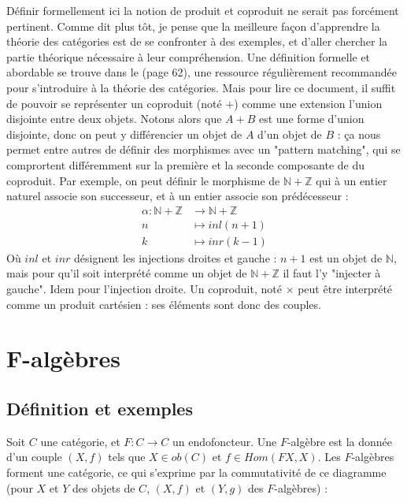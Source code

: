 \documentclass{article}
\newcommand{\N}{\mathbb{N}}
\newcommand{\Z}{\mathbb{Z}}
\begin{document}
Définir formellement ici la notion de produit et coproduit ne serait pas forcément pertinent. Comme dit plus tôt, je pense que la meilleure façon d'apprendre la théorie des catégories est de se confronter à des exemples, et d'aller chercher la partie théorique nécessaire à leur compréhension. Une définition formelle et abordable se trouve dans le \cite{MacLane} (page 62), une ressource régulièrement recommandée pour s'introduire à la théorie des catégories. Mais pour lire ce document, il suffit de pouvoir se représenter un coproduit (noté $+$) comme une extension l'union disjointe entre deux objets. Notons alors que $A+B$ est une forme d'union disjointe, donc on peut y différencier un objet de $A$ d'un objet de $B$ : ça nous permet entre autres de définir des morphismes avec un "pattern matching", qui se comprortent différemment sur la première et la seconde composante de du coproduit. Par exemple, on peut définir le morphisme de $\N + \Z$ qui à un entier naturel associe son successeur, et à un entier associe son prédécesseur : 
\begin{align*}
     \alpha : \N + \Z & \rightarrow \N + \Z \\ 
     n & \mapsto inl(n+1) \\ 
     k & \mapsto inr(k-1)     
\end{align*}
Où $inl$ et $inr$ désignent les injections droites et gauche : $n+1$ est un objet de $\N$, mais pour qu'il soit interprété comme un objet de $\N + \Z$ il faut l'y "injecter à gauche". Idem pour l'injection droite. Un coproduit, noté $\times$ peut être interprété comme un produit cartésien : ses éléments sont donc des couples.


\section{F-algèbres}

\subsection{Définition et exemples}
Soit $C$ une catégorie, et $F :C \longrightarrow C$ un endofoncteur. Une $F$-algèbre est la donnée d'un couple $(X,f)$ tels que $X \in ob(C)$ et $f \in Hom(F X, X)$. Les $F$-algèbres forment une catégorie, ce qui s'exprime par la commutativité de ce diagramme (pour $X$ et $Y$ des objets de $C$, $(X,f)$ et $(Y,g)$ des $F$-algèbres) : 

\begin{center}
\end{center}
\end{document}
